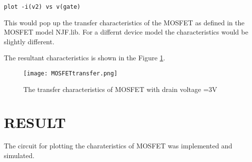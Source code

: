\texttt{plot -i(v2) vs v(gate)}

This would pop up the transfer characteristics of the MOSFET as defined in the MOSFET model NJF.lib. For a differnt device model the characteristics would be slightly different.

The resultant characteristics is shown in the Figure \ref{MOSFETtransfer}.


\begin{figure}[h]
\centering
\texttt{[image: MOSFETtransfer.png]}
\caption{The transfer characteristics of MOSFET with drain voltage =3V }
\label{MOSFETtransfer}
\end{figure}


\section*{RESULT}
The circuit for plotting the charateristics of MOSFET was implemented and simulated.


